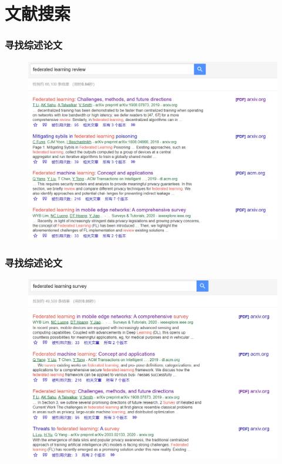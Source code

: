 \documentclass[hyperref={pdfpagelabels=false}]{beamer}
\begin{document}
\section{文献搜索}
\begin{frame}
	\tableofcontents[currentsection]
\end{frame} 
\begin{frame}
	\frametitle{寻找综述论文}
	\begin{figure}
		\centering
		\includegraphics[width=\textheight]{2.png}
	\end{figure}
\end{frame}

\begin{frame}
	\frametitle{寻找综述论文}
	\begin{figure}
		\centering
		\includegraphics[width=\textheight]{3.png}
	\end{figure}
\end{frame}
\end{document}

